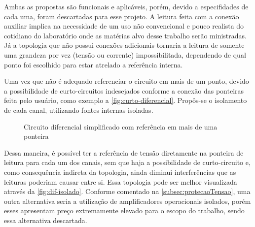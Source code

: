 Ambas as propostas são funcionais e aplicáveis, porém, devido a especifidades de cada uma, foram descartadas para esse projeto. A leitura feita com a conexão auxiliar implica na necessidade de um uso não convencional e pouco realista do cotidiano do laboratório onde as matérias alvo desse trabalho serão ministradas. Já a topologia que não possui conexões adicionais tornaria a leitura de somente uma grandeza por vez (tensão ou corrente) impossibilitada, dependendo de qual ponto foi escolhido para estar atrelado a referência interna.

Uma vez que não é adequado referenciar o circuito em mais de um ponto, devido a possibilidade de curto-circuitos indesejados conforme a conexão das ponteiras feita pelo usuário, como exemplo a \autoref{fig:curto-diferencial}. Propôs-se o isolamento de cada canal, utilizando fontes internas isoladas.

\begin{figure}[htb!]
    \caption{Circuito diferencial simplificado com referência em mais de uma ponteira}
    \label{fig:curto-diferencial}
    \fonte{}
\end{figure}

Dessa maneira, é possível ter a referência de tensão diretamente na ponteira de leitura para cada um dos canais, sem que haja a possibilidade de curto-circuito e, como consequência indireta da topologia, ainda diminui interferências que as leituras poderiam causar entre si. Essa topologia pode ser melhor visualizada através da \autoref{fig:dif-isolado}.
Conforme comentado na \autoref{subsec:protecaoTensao}, uma outra alternativa seria a utilização de amplificadores operacionais isolados, porém esses apresentam preço extremamente elevado para o escopo do trabalho, sendo essa alternativa descartada.

